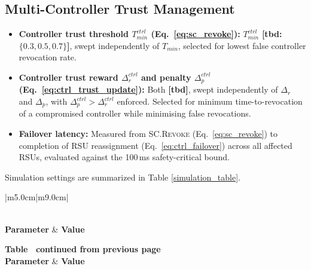 \documentclass[12pt, a4paper]{report}
\begin{document}
{{\subsection{Multi-Controller Trust Management}
\begin{itemize}
    \item \textbf{Controller trust threshold
    $T_{min}^{ctrl}$ (Eq.~\ref{eq:sc_revoke}):}
    $T_{min}^{ctrl}$ \textbf{[tbd:
    $\{0.3, 0.5, 0.7\}$]}, swept independently
    of $T_{min}$, selected for lowest false
    controller revocation rate.

    \item \textbf{Controller trust reward
    $\Delta_r^{ctrl}$ and penalty
    $\Delta_p^{ctrl}$
    (Eq.~\ref{eq:ctrl_trust_update}):}
    Both \textbf{[tbd]}, swept independently
    of $\Delta_r$ and $\Delta_p$, with
    $\Delta_p^{ctrl} > \Delta_r^{ctrl}$ enforced.
    Selected for minimum time-to-revocation of a
    compromised controller while minimising false
    revocations.

    \item \textbf{Failover latency:}
    Measured from \textsc{SC.Revoke}
    (Eq.~\ref{eq:sc_revoke}) to completion of RSU
    reassignment (Eq.~\ref{eq:ctrl_failover})
    across all affected RSUs, evaluated against
    the 100\,ms safety-critical bound.
\end{itemize}

Simulation settings are summarized in Table \ref{simulation_table}.

\begin{longtable}{|m{5.0cm}|m{9.0cm}|}
\caption{Simulation settings.}
\label{simulation_table}\\
\hline
\textbf{Parameter} & \textbf{Value} \\
\hline
\endfirsthead

%
{{\bfseries Table \thetable\ continued from previous page}} \\
\hline
\textbf{Parameter} & \textbf{Value} \\
\hline
\endhead

\hline
{} \\
\endfoot


\end{longtable}}}
\end{document}
